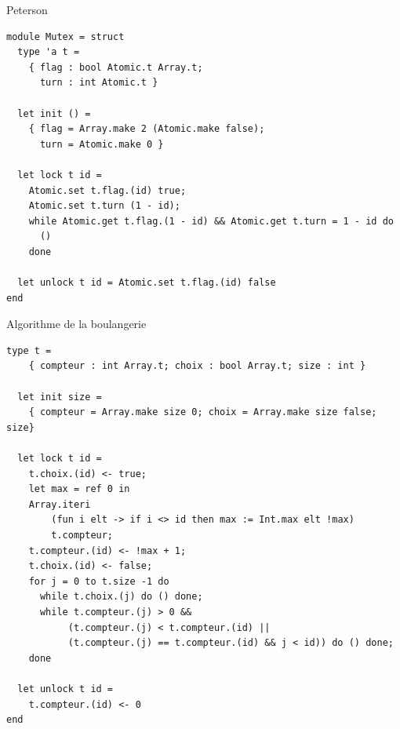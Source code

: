\begin{frame}[fragile]{Peterson}
\begin{lstlisting}
module Mutex = struct
  type 'a t = 
    { flag : bool Atomic.t Array.t; 
      turn : int Atomic.t }

  let init () =
    { flag = Array.make 2 (Atomic.make false); 
      turn = Atomic.make 0 }

  let lock t id =
    Atomic.set t.flag.(id) true;
    Atomic.set t.turn (1 - id);
    while Atomic.get t.flag.(1 - id) && Atomic.get t.turn = 1 - id do
      ()
    done
    
  let unlock t id = Atomic.set t.flag.(id) false
end
\end{lstlisting}

\end{frame}

\begin{frame}[fragile]{Algorithme de la boulangerie}
\begin{lstlisting}[basicstyle=\scriptsize\ttfamily]
  type t =
    { compteur : int Array.t; choix : bool Array.t; size : int }
    
  let init size =
    { compteur = Array.make size 0; choix = Array.make size false; size} 

  let lock t id =
    t.choix.(id) <- true;
    let max = ref 0 in
    Array.iteri 
        (fun i elt -> if i <> id then max := Int.max elt !max) 
        t.compteur;
    t.compteur.(id) <- !max + 1;
    t.choix.(id) <- false;
    for j = 0 to t.size -1 do
      while t.choix.(j) do () done;
      while t.compteur.(j) > 0 &&
           (t.compteur.(j) < t.compteur.(id) ||
           (t.compteur.(j) == t.compteur.(id) && j < id)) do () done;
    done

  let unlock t id =
    t.compteur.(id) <- 0
end
\end{lstlisting}

\end{frame}
